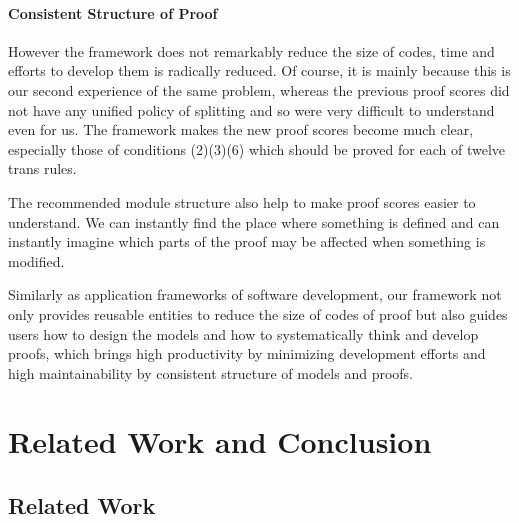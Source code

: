 \documentclass[12pt]{report}
\begin{document}
\subsubsection{Consistent Structure of Proof}
However the framework does not remarkably reduce the size of codes,
time and efforts to develop them is radically reduced. Of course, it
is mainly because this is our second experience of the same problem,
whereas the previous proof scores did not have any unified policy of
splitting and so were very difficult to understand even for us. The
framework makes the new proof scores become much clear, especially
those of conditions (2)(3)(6) which should be proved for each of
twelve trans rules.

The recommended module structure also help to make proof scores easier
to understand.  We can instantly find the place where something is
defined and can instantly imagine which parts of the proof may be
affected when something is modified.

Similarly as application frameworks of software development, our
framework not only provides reusable entities to reduce the size of
codes of proof but also guides users how to design the models and how
to systematically think and develop proofs, which brings high
productivity by minimizing development efforts and high
maintainability by consistent structure of models and proofs.

\chapter{Related Work and Conclusion}
\label{chap:conclusion}
\section{Related Work}
\end{document}
